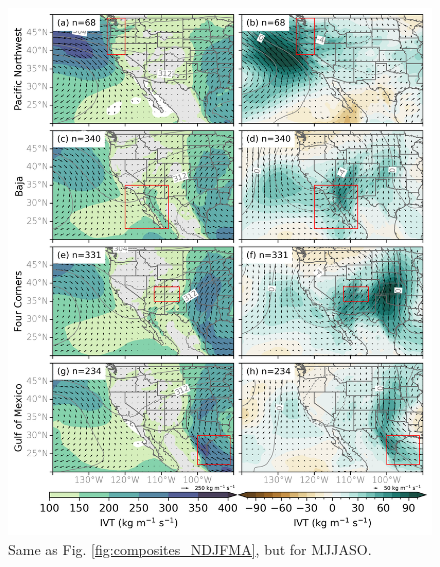 \documentclass[draft]{agujournal2019}
\begin{document}
\begin{figure}
\noindent\includegraphics[width=\textwidth, height=\textheight, keepaspectratio]{fig8.png}
\caption{Same as Fig. \ref{fig:composites_NDJFMA}, but for MJJASO.}
\label{fig:composites_MJJASO}
\end{figure}
\end{document}
